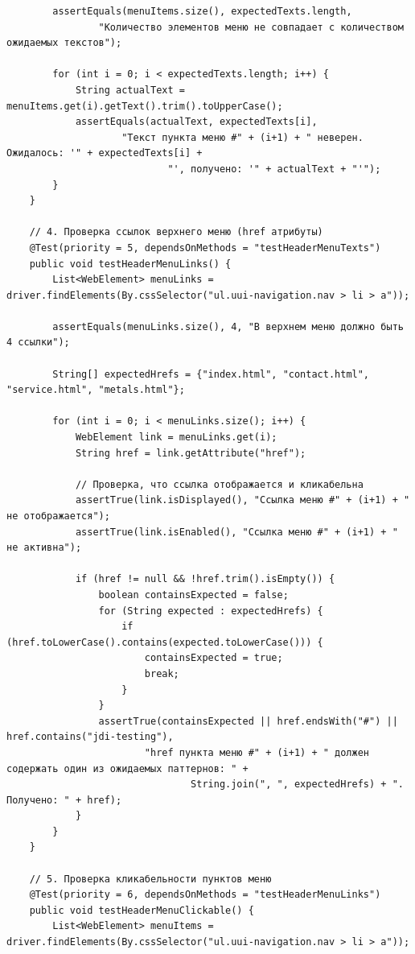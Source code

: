 \documentclass{article}[14pt]
\begin{document}
\begin{lstlisting}
        assertEquals(menuItems.size(), expectedTexts.length,
                "Количество элементов меню не совпадает с количеством ожидаемых текстов");

        for (int i = 0; i < expectedTexts.length; i++) {
            String actualText = menuItems.get(i).getText().trim().toUpperCase();
            assertEquals(actualText, expectedTexts[i],
                    "Текст пункта меню #" + (i+1) + " неверен. Ожидалось: '" + expectedTexts[i] +
                            "', получено: '" + actualText + "'");
        }
    }

    // 4. Проверка ссылок верхнего меню (href атрибуты)
    @Test(priority = 5, dependsOnMethods = "testHeaderMenuTexts")
    public void testHeaderMenuLinks() {
        List<WebElement> menuLinks = driver.findElements(By.cssSelector("ul.uui-navigation.nav > li > a"));

        assertEquals(menuLinks.size(), 4, "В верхнем меню должно быть 4 ссылки");

        String[] expectedHrefs = {"index.html", "contact.html", "service.html", "metals.html"};

        for (int i = 0; i < menuLinks.size(); i++) {
            WebElement link = menuLinks.get(i);
            String href = link.getAttribute("href");

            // Проверка, что ссылка отображается и кликабельна
            assertTrue(link.isDisplayed(), "Ссылка меню #" + (i+1) + " не отображается");
            assertTrue(link.isEnabled(), "Ссылка меню #" + (i+1) + " не активна");

            if (href != null && !href.trim().isEmpty()) {
                boolean containsExpected = false;
                for (String expected : expectedHrefs) {
                    if (href.toLowerCase().contains(expected.toLowerCase())) {
                        containsExpected = true;
                        break;
                    }
                }
                assertTrue(containsExpected || href.endsWith("#") || href.contains("jdi-testing"),
                        "href пункта меню #" + (i+1) + " должен содержать один из ожидаемых паттернов: " +
                                String.join(", ", expectedHrefs) + ". Получено: " + href);
            }
        }
    }

    // 5. Проверка кликабельности пунктов меню
    @Test(priority = 6, dependsOnMethods = "testHeaderMenuLinks")
    public void testHeaderMenuClickable() {
        List<WebElement> menuItems = driver.findElements(By.cssSelector("ul.uui-navigation.nav > li > a"));


\end{lstlisting}
\end{document}
